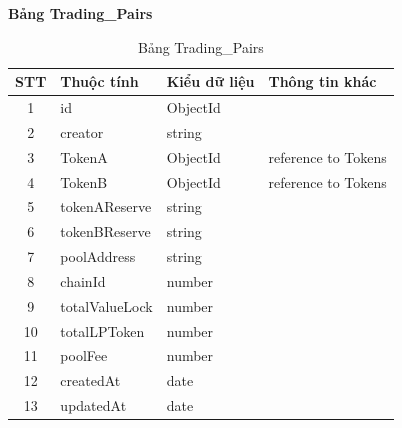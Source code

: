 \hspace{-1cm}\textbf{Bảng Trading\_Pairs}
\begin{table}[H]
    \centering
    \begin{tabular}{|c|l|l|l|}
        \hline
        STT & Thuộc tính     & Kiểu dữ liệu & Thông tin khác      \\
        \hline
        1   & id             & ObjectId     &                     \\
        \hline
        2   & creator        & string       &                     \\
        \hline
        3   & TokenA         & ObjectId     & reference to Tokens \\
        \hline
        4   & TokenB         & ObjectId     & reference to Tokens \\
        \hline
        5   & tokenAReserve  & string       &                     \\
        \hline
        6   & tokenBReserve  & string       &                     \\
        \hline
        7   & poolAddress    & string       &                     \\
        \hline
        8   & chainId        & number       &                     \\
        \hline
        9   & totalValueLock & number       &                     \\
        \hline
        10  & totalLPToken   & number       &                     \\
        \hline
        11  & poolFee        & number       &                     \\
        \hline
        12  & createdAt      & date         &                     \\
        \hline
        13  & updatedAt      & date         &                     \\
        \hline
    \end{tabular}
    \caption{Bảng Trading\_Pairs}
    \label{tab:trading-pairs}
\end{table}

